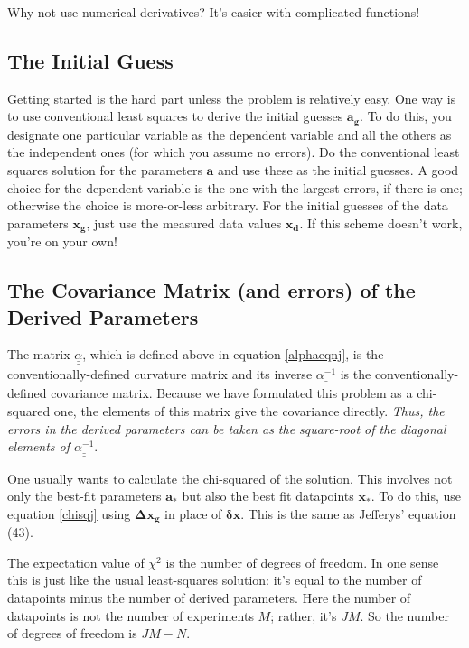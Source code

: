 \documentclass[psfig,preprint]{aastex}
\begin{document}
	Why not use numerical derivatives? It's easier with complicated functions!

\subsection{The Initial Guess}

	Getting started is the hard part unless the problem is
relatively easy.  One way is to use conventional least squares to derive
the initial guesses $\mathbf {a_g}$.  To do this, you designate one
particular variable as the dependent variable and all the others as the
independent ones (for which you assume no errors).  Do the conventional
least squares solution for the parameters $\mathbf a$ and use these as
the initial guesses.  A good choice for the dependent variable is the
one with the largest errors, if there is one; otherwise the choice is
more-or-less arbitrary.  For the initial guesses of the data parameters
$\mathbf {x_g}$, just use the measured data values $\mathbf {x_d}$.  If
this scheme doesn't work, you're on your own!

\subsection{The Covariance Matrix (and errors) of the Derived Parameters}

The matrix $\underline{\underline{\alpha}}$, which is defined above in
equation \ref{alphaeqnj}, is the conventionally-defined curvature matrix
and its inverse $\underline{\underline{\alpha^{-1} }}$ is the
conventionally-defined covariance matrix.  Because we have formulated
this problem as a chi-squared one, the elements of this matrix give the
covariance directly. {\it Thus, the errors in the derived parameters can
  be taken as the square-root of the diagonal elements of
  $\underline{\underline{\alpha^{-1} }}$}.  

	One usually wants to calculate the chi-squared of the solution. 
This involves not only the best-fit parameters $\mathbf a_*$ but also
the best fit datapoints $\mathbf x_*$.  To do this, use equation
\ref{chisqj} using $\mathbf{ \Delta x_g}$ in place of $\mathbf {\delta x}$. 
This is the same as Jefferys' equation (43). 

	The expectation value of $\chi^2$
is the number of degrees of freedom. In one sense this is just like the usual
least-squares solution: it's equal to the number of datapoints minus
the number of derived parameters. Here the number of datapoints is not
the number of experiments $M$; rather, it's $JM$. So the number of
degrees of freedom is $JM - N$.
\end{document}
